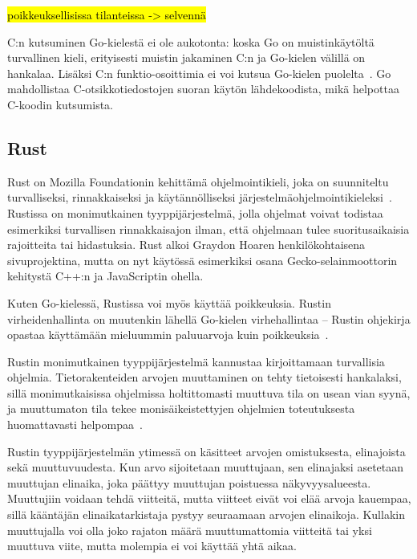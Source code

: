 \hl{poikkeuksellisissa tilanteissa -> selvennä}

C:n kutsuminen Go-kielestä ei ole aukotonta: koska Go on muistinkäytöltä
turvallinen kieli, erityisesti muistin jakaminen C:n ja Go-kielen välillä on
hankalaa. Lisäksi C:n funktio-osoittimia ei voi kutsua Go-kielen
puolelta~\citep{cgo}. Go mahdollistaa C-otsikkotiedostojen suoran käytön
lähdekoodista, mikä helpottaa C-koodin kutsumista.

\subsection{Rust}

Rust on Mozilla Foundationin kehittämä ohjelmointikieli, joka on suunniteltu
turvalliseksi, rinnakkaiseksi ja käytännölliseksi
järjestelmäohjelmointikieleksi~\citep{rustfaq}. Rustissa on monimutkainen
tyyppijärjestelmä, jolla ohjelmat voivat todistaa esimerkiksi turvallisen
rinnakkaisajon ilman, että ohjelmaan tulee suoritusaikaisia rajoitteita tai
hidastuksia. Rust alkoi Graydon Hoaren henkilökohtaisena sivuprojektina, mutta
on nyt käytössä esimerkiksi osana Gecko-se\-lain\-moot\-to\-rin kehitystä C++:n ja
JavaScriptin ohella.

Kuten Go-kielessä, Rustissa voi myös käyttää poikkeuksia. Rustin
virheidenhallinta on muutenkin lähellä Go-kielen virhehallintaa -- Rustin
ohjekirja opastaa käyttämään mieluummin paluuarvoja kuin
poikkeuksia~\citep{rusterrorhandling}.

Rustin monimutkainen tyyppijärjestelmä kannustaa kirjoittamaan turvallisia
ohjelmia. Tietorakenteiden arvojen muuttaminen on tehty tietoisesti hankalaksi,
sillä monimutkaisissa ohjelmissa holtittomasti muuttuva tila on usean vian
syynä, ja muuttumaton tila tekee monisäikeistettyjen
ohjelmien toteutuksesta huomattavasti helpompaa~\citep[luku 4, kohta
17]{effectivejava}.

Rustin tyyppijärjestelmän ytimessä on käsitteet arvojen
omistuksesta, elinajoista sekä
muuttuvuudesta. Kun arvo sijoitetaan muuttujaan, sen
elinajaksi asetetaan muuttujan elinaika, joka päättyy muuttujan poistuessa
näkyvyysalueesta. Muuttujiin voidaan tehdä viitteitä, mutta
viitteet eivät voi elää arvoja kauempaa, sillä kääntäjän
elinaikatarkistaja pystyy seuraamaan arvojen
elinaikoja. Kullakin muuttujalla voi olla joko rajaton määrä muuttumattomia
viitteitä tai yksi muuttuva viite, mutta molempia ei voi käyttää yhtä aikaa.


